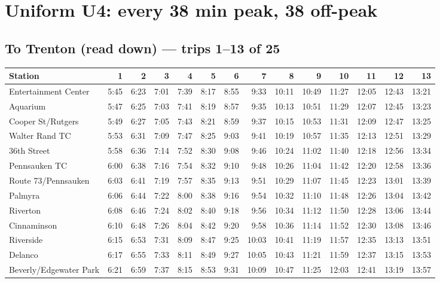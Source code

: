 \section{Uniform U4: every 38 min peak, 38 off-peak}\label{tt:uniform_U4}
\subsection*{To Trenton (read down) --- trips 1--13 of 25}
\begin{center}\footnotesize\setlength{\tabcolsep}{3pt}\begin{tabular}{@{}lrrrrrrrrrrrrr@{}}\toprule
Station & 1 & 2 & 3 & 4 & 5 & 6 & 7 & 8 & 9 & 10 & 11 & 12 & 13 \\\midrule
Entertainment Center & 5:45 & 6:23 & 7:01 & 7:39 & 8:17 & 8:55 & 9:33 & 10:11 & 10:49 & 11:27 & 12:05 & 12:43 & 13:21 \\
Aquarium & 5:47 & 6:25 & 7:03 & 7:41 & 8:19 & 8:57 & 9:35 & 10:13 & 10:51 & 11:29 & 12:07 & 12:45 & 13:23 \\
Cooper St/Rutgers & 5:49 & 6:27 & 7:05 & 7:43 & 8:21 & 8:59 & 9:37 & 10:15 & 10:53 & 11:31 & 12:09 & 12:47 & 13:25 \\
Walter Rand TC & 5:53 & 6:31 & 7:09 & 7:47 & 8:25 & 9:03 & 9:41 & 10:19 & 10:57 & 11:35 & 12:13 & 12:51 & 13:29 \\
36th Street & 5:58 & 6:36 & 7:14 & 7:52 & 8:30 & 9:08 & 9:46 & 10:24 & 11:02 & 11:40 & 12:18 & 12:56 & 13:34 \\
Pennsauken TC & 6:00 & 6:38 & 7:16 & 7:54 & 8:32 & 9:10 & 9:48 & 10:26 & 11:04 & 11:42 & 12:20 & 12:58 & 13:36 \\
Route 73/Pennsauken & 6:03 & 6:41 & 7:19 & 7:57 & 8:35 & 9:13 & 9:51 & 10:29 & 11:07 & 11:45 & 12:23 & 13:01 & 13:39 \\
Palmyra & 6:06 & 6:44 & 7:22 & 8:00 & 8:38 & 9:16 & 9:54 & 10:32 & 11:10 & 11:48 & 12:26 & 13:04 & 13:42 \\
Riverton & 6:08 & 6:46 & 7:24 & 8:02 & 8:40 & 9:18 & 9:56 & 10:34 & 11:12 & 11:50 & 12:28 & 13:06 & 13:44 \\
Cinnaminson & 6:10 & 6:48 & 7:26 & 8:04 & 8:42 & 9:20 & 9:58 & 10:36 & 11:14 & 11:52 & 12:30 & 13:08 & 13:46 \\
Riverside & 6:15 & 6:53 & 7:31 & 8:09 & 8:47 & 9:25 & 10:03 & 10:41 & 11:19 & 11:57 & 12:35 & 13:13 & 13:51 \\
Delanco & 6:17 & 6:55 & 7:33 & 8:11 & 8:49 & 9:27 & 10:05 & 10:43 & 11:21 & 11:59 & 12:37 & 13:15 & 13:53 \\
Beverly/Edgewater Park & 6:21 & 6:59 & 7:37 & 8:15 & 8:53 & 9:31 & 10:09 & 10:47 & 11:25 & 12:03 & 12:41 & 13:19 & 13:57 \\

\end{tabular}
\end{center}
